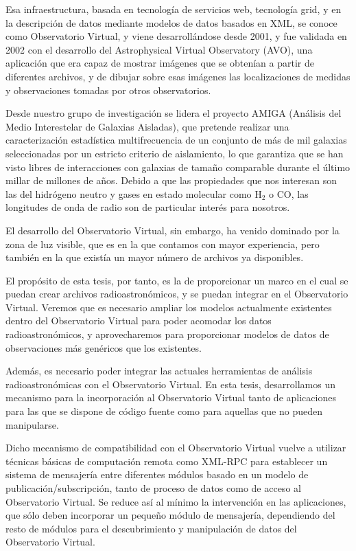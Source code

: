 	Esa infraestructura, basada en tecnología de servicios web,
	tecnología grid, y en la descripción de datos mediante modelos
	de datos basados en XML, se conoce como Observatorio Virtual, y
	viene desarrollándose desde 2001, y fue validada
	en 2002 con el desarrollo del Astrophysical Virtual Observatory
	(AVO), una aplicación que era capaz de mostrar imágenes que
	se obtenían a partir de diferentes archivos, y de dibujar sobre
	esas imágenes las localizaciones de medidas y observaciones
	tomadas por otros observatorios.
	
	Desde nuestro grupo de investigación se lidera el proyecto
	AMIGA (Análisis del Medio Interestelar de Galaxias Aisladas),
	que pretende realizar una caracterización estadística
	multifrecuencia de un conjunto de más de mil galaxias
	seleccionadas por un estricto criterio de aislamiento, lo que
	garantiza que se han visto libres de interacciones con galaxias
	de tamaño comparable durante el último millar de millones de
	años. Debido a que las propiedades que nos interesan son las 
	del hidrógeno neutro y gases en estado molecular como
	H${}_2$ o CO, las longitudes de onda de radio son de particular
	interés para nosotros.
	
	El desarrollo del Observatorio Virtual, sin embargo, ha venido
	dominado por la zona de luz visible, que es en la que contamos
	con mayor experiencia, pero también en la que existía un mayor
	número de archivos ya disponibles.
	
	El propósito de esta tesis, por tanto, es la de proporcionar
	un marco en el cual se puedan crear archivos radioastronómicos,
	y se puedan integrar en el Observatorio Virtual. Veremos que
	es necesario ampliar los modelos actualmente existentes
	dentro del Observatorio Virtual para poder acomodar los datos
	radioastronómicos, y aprovecharemos para proporcionar modelos
	de datos de observaciones más genéricos que los existentes.
	
	Además, es necesario poder integrar las actuales herramientas
	de análisis radioastronómicas con el Observatorio Virtual.
	En esta tesis, desarrollamos un mecanismo para la incorporación
	al Observatorio Virtual tanto de aplicaciones para las que se
	dispone de código fuente como para aquellas que no pueden
	manipularse.
	
	Dicho mecanismo de compatibilidad con el Observatorio Virtual
	vuelve a utilizar técnicas básicas de computación remota como
	XML-RPC para establecer un sistema de mensajería entre
	diferentes módulos basado en un modelo de
	publicación/subscripción, tanto de proceso de datos como de
	acceso al Observatorio Virtual. Se reduce así al mínimo la
	intervención en las aplicaciones, que sólo deben incorporar un
	pequeño módulo de mensajería, dependiendo del resto de módulos
	para el descubrimiento y manipulación de datos del Observatorio
	Virtual.
	
